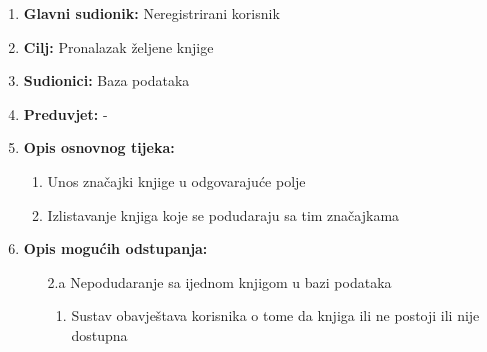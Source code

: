 \documentclass[12pt]{report}
\begin{document}
\noindent {}
\begin{enumerate}
	
	\item \textbf{Glavni sudionik: } Neregistrirani korisnik
	\item  \textbf{Cilj:} Pronalazak željene knjige
	\item  \textbf{Sudionici:} Baza podataka
	\item  \textbf{Preduvjet:} -
	\item  \textbf{Opis osnovnog tijeka:}
	
	\begin{enumerate}
		
		\item Unos značajki knjige u odgovarajuće polje
		\item Izlistavanje knjiga koje se podudaraju sa tim značajkama
		
	\end{enumerate}
	
	\item  \textbf{Opis mogućih odstupanja:}
	
	\item[] \begin{enumerate}
		
		\item[2.a] Nepodudaranje sa ijednom knjigom u bazi podataka
		\item[] \begin{enumerate}
			
			\item Sustav obavještava korisnika o tome da knjiga ili ne postoji ili nije dostupna
			
		\end{enumerate}
		
	\end{enumerate}
	
\end{enumerate}
\end{document}
